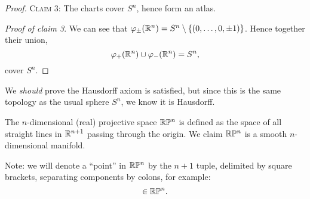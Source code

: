 \begin{proof}
\smallbreak
  \textsc{Claim 3:} The charts cover $S^{n}$, hence form an atlas.

\noindent\textit{Proof of claim 3}.  We can see that $\varphi_{\pm}(\mathbb{R}^{n})=S^{n}\setminus\{(0,\dots,0,\pm1)\}$.
  Hence together their union,
  \begin{equation}
\varphi_{+}(\mathbb{R}^{n})\cup\varphi_{-}(\mathbb{R}^{n}) = S^{n},
  \end{equation}
cover $S^{n}$.
\end{proof}

\begin{remark}
We \emph{should} prove the Hausdorff axiom is satisfied, but since this
is the same topology as the usual sphere $S^{n}$, we know it is Hausdorff.
\end{remark}

\begin{example}\label{ex:manifold:projective-space}
The $n$-dimensional (real) projective space $\mathbb{R}\mathbb{P}^{n}$ is defined as the
space of all straight lines in $\mathbb{R}^{n+1}$ passing through the origin.
We claim $\mathbb{R}\mathbb{P}^{n}$ is a smooth $n$-dimensional manifold.
\end{example}

Note: we will denote a ``point'' in $\mathbb{R}\mathbb{P}^{n}$ by the $n+1$ tuple,
delimited by square brackets, separating components by colons, for
example:
\begin{equation}
[y_{1} : y_{2} : \cdots : y_{n+1}]\in\RP^{n}.
\end{equation}


